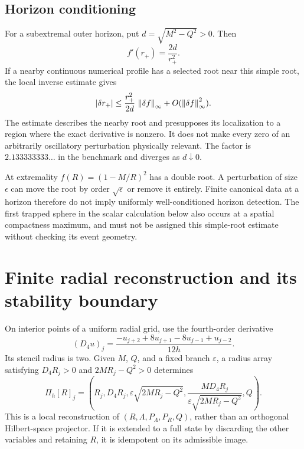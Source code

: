 \subsection{Horizon conditioning}
For a subextremal outer horizon, put $d=\sqrt{M^2-Q^2}>0$. Then
\begin{equation}
 f'(r_+)=\frac{2d}{r_+^2}.
\end{equation}
If a nearby continuous numerical profile has a selected root near this simple root, the local inverse estimate gives
\begin{equation}
 |\delta r_+|\le\frac{r_+^2}{2d}\,\left\lVert\delta f\right\rVert_\infty
                    +O(\left\lVert\delta f\right\rVert_\infty^2).
\label{c:strong:root-bound}
\end{equation}
The estimate describes the nearby root and presupposes its localization to a region where the exact derivative is nonzero. It does not make every zero of an arbitrarily oscillatory perturbation physically relevant. The factor is $2.133333333\ldots$ in the benchmark and diverges as $d\downarrow0$.

At extremality $f(R)=(1-M/R)^2$ has a double root. A perturbation of size $\epsilon$ can move the root by order $\sqrt\epsilon$ or remove it entirely. Finite canonical data at a horizon therefore do not imply uniformly well-conditioned horizon detection. The first trapped sphere in the scalar calculation below also occurs at a spatial compactness maximum, and must not be assigned this simple-root estimate without checking its event geometry.

\section{Finite radial reconstruction and its stability boundary}
\label{c:strong:finite-reconstruction}

On interior points of a uniform radial grid, use the fourth-order derivative
\begin{equation}
 (D_4u)_j=\frac{-u_{j+2}+8u_{j+1}-8u_{j-1}+u_{j-2}}{12h}.
\end{equation}
Its stencil radius is two. Given $M$, $Q$, and a fixed branch $\varepsilon$, a radius array satisfying $D_4R_j>0$ and $2MR_j-Q^2>0$ determines
\begin{equation}
 \Pi_h[R]_j=\left(R_j,D_4R_j,
                 \varepsilon\sqrt{2MR_j-Q^2},
                 \frac{M D_4R_j}{\varepsilon\sqrt{2MR_j-Q^2}},Q\right).
\label{c:strong:reconstruct}
\end{equation}
This is a local reconstruction of $(R,\Lambda,P_\Lambda,P_R,Q)$, rather than an orthogonal Hilbert-space projector. If it is extended to a full state by discarding the other variables and retaining $R$, it is idempotent on its admissible image.

